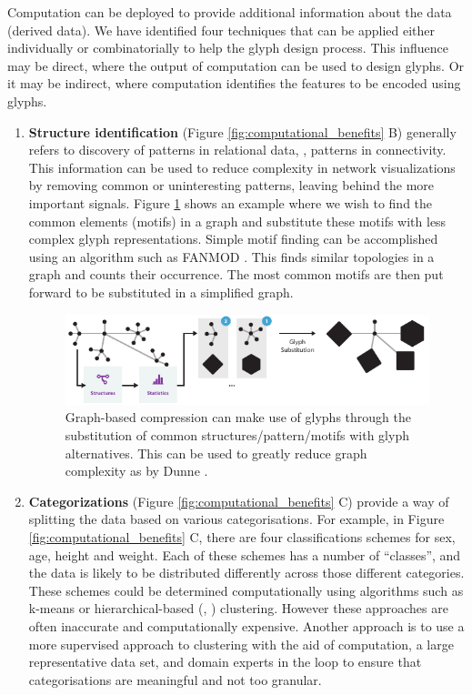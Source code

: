 Computation can be deployed to provide additional information about the data (derived data).
We have identified four techniques that can be applied either individually or combinatorially to help the glyph design process.
This influence may be direct, where the output of computation can be used to design glyphs.
Or it may be indirect, where computation identifies the features to be encoded using glyphs.
\begin{enumerate}

\item \textbf{Structure identification} (Figure \ref{fig:computational_benefits} B) generally refers to discovery of patterns in relational data, \eg, patterns in connectivity.
This information can be used to reduce complexity in network visualizations by removing common or uninteresting patterns, leaving behind the more important signals.
Figure \ref{fig:structure_compress_glyph} shows an example where we wish to find the common elements (motifs) in a graph and substitute these motifs with less complex glyph representations. 
Simple motif finding can be accomplished using an algorithm such as FANMOD \cite{wernicke06}.
This finds similar topologies in a graph and counts their occurrence.
The most common motifs are then put forward to be substituted in a simplified graph.

\begin{figure}[h!]
\centering
\includegraphics[width=\textwidth]{images/ch3/structure_compress_glyph}
\caption{Graph-based compression can make use of glyphs through the substitution of common structures/pattern/motifs with glyph alternatives.
This can be used to greatly reduce graph complexity as by Dunne \etal \cite{dunnemotif2012}.}
\label{fig:structure_compress_glyph}
\end{figure}

\item \textbf{Categorizations} (Figure \ref{fig:computational_benefits} C) provide a way of splitting the data based on various categorisations.
For example, in Figure \ref{fig:computational_benefits} C, there are four classifications schemes for sex, age, height and weight.
Each of these schemes has a number of ``classes'', and the data is likely to be distributed differently across those different categories.
These schemes could be determined computationally using algorithms such as k-means \cite{macqueen1967} or hierarchical-based (\eg, \cite{Sibson01011973}) clustering.
However these approaches are often inaccurate and computationally expensive.
Another approach is to use a more supervised approach to clustering with the aid of computation, a large representative data set, and domain experts in the loop to ensure that categorisations are meaningful and not too granular.


\end{enumerate}
